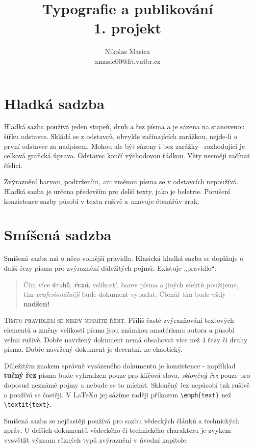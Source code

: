 \documentclass[twocolumn,10pt]{article}
\title{Typografie a publikování\\
\renewcommand{\baselinestretch}{1.5}            \large 1. projekt}
\author{Nikolas Masica\\
            xmasic00@fit.vutbr.cz}
\date{}
\renewcommand{\baselinestretch}{1.5}            \large 1. projekt}
\begin{document}
\maketitle

\section{Hladká sadzba} \label{Hladká sadzba}
Hladká sazba používá jeden stupeň, druh a řez písma a je sázena na stanovenou šířku odstavce. Skládá se z odstavců, obvykle začínajících zarážkou, nejde-li o první odstavec za nadpisem. Mohou ale být sázeny i bez zarážky\,--\,rozhodující je celková grafická úprava. Odstavec končí východovou řádkou. Věty nesmějí začínat číslicí.

Zvýraznění barvou, podtržením, ani změnou písma se v odstavcích nepoužívá. Hladká sazba je určena především pro delší texty, jako je beletrie. Porušení konzistence sazby působí v textu rušivě a unavuje čtenářův zrak.

\section{Smíšená sadzba} \label{Smíšená sadzba}
Smíšená sazba má o něco volnější pravidla. Klasická hladká sazba se doplňuje o další řezy písma pro zvýraznění důležitých pojmů. Existuje „pravidlo“:
\begin{quotation}
\renewcommand{\baselinestretch}{0.5}
Čím více \texttt{druhů}, \emph{\textbf{řezů}}, {\small{velikostí}}, barev písma \textsf{a jiných efektů} použijeme, tím \emph{profesionálněji} bude dokument vypadat. Čtenář tím {\tiny{bude}} vždy \huge{\textbf{nadšen!}}
\end{quotation}

\textsc{Tímto pravidlem se nikdy nesmíte řídit}. Příliš časté zvýrazňování textových elementů a změny velikosti písma jsou známkou amatérismu autora a působí velmi rušivě. Dobře navržený dokument nemá obsahovat více než
4 řezy či druhy písma. Dobře navržený dokument je decentní, ne chaotický.

Důležitým znakem správně vysázeného dokumentu je konzistence - například \textbf{tučný řez} písma bude vyhradzen pouze pro klíčová slova, \emph{skloněný řez} pouze pro doposud neznámé pojmy a nebude se to míchat. Skloněný řez nepůsobí tak rušivě a používá se častěji. V \LaTeX u jej sázíme raději příkazem \verb|\emph{text}| než \verb|\textit{text}|.

Smíšená sazba se nejčastěji používá pro sazbu vědeckých článků a technických zpráv. U delších dokumentů vědeckého či technického charakteru je zvykem vysvětlit význam různých typů zvýraznění v úvodní kapitole.
\end{document}
